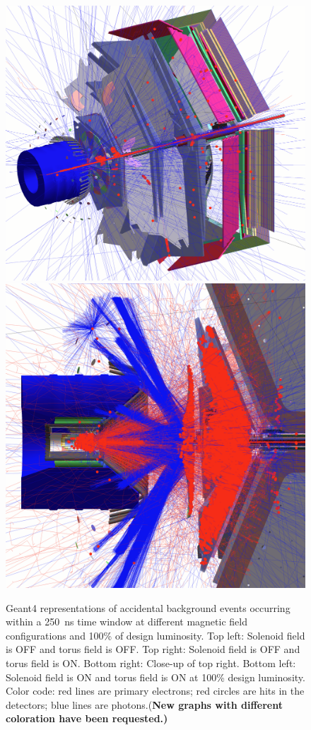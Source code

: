 \documentclass[final,3p,twocolumn]{elsarticle}
\begin{document}
\begin{figure}[htbp!]
{}
\vspace{0.3cm}
\centerline{
	\includegraphics[width=1.0\columnwidth, height=1.0\columnwidth]{FullSolenoidFullTorus.png}
	\includegraphics[width=1.0\columnwidth, height=1.0\columnwidth]{NoSolenoidFullTorusCut2.png}
}
\caption{Geant4 representations of accidental background events occurring within a 250~ns time window at
  different magnetic field configurations and 100\% of design luminosity. Top left: Solenoid field is OFF and
  torus field is OFF. Top right: Solenoid field is OFF and torus field is ON. Bottom right: Close-up of top right.
  Bottom left: Solenoid field is ON and torus field is ON at 100\% design luminosity. Color code: red lines are
  primary electrons; red circles are hits in the detectors; blue lines are photons.({\bf New graphs with different 
  coloration have been requested.)}}
  

\end{figure}
\end{document}

